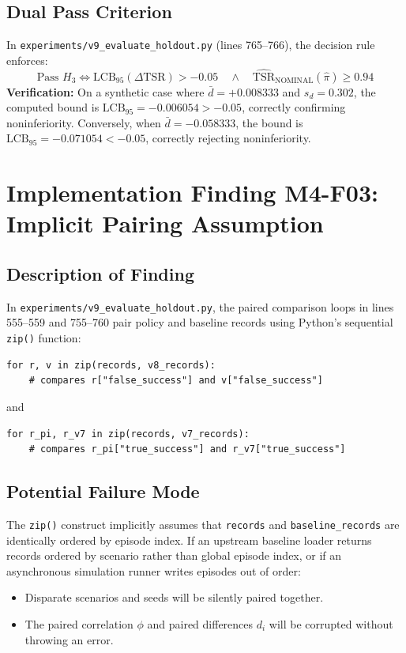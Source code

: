 \documentclass[10pt,a4paper]{article}
\begin{document}
\subsection{Dual Pass Criterion}
In \texttt{experiments/v9\_evaluate\_holdout.py} (lines 765--766), the decision rule enforces:
\begin{equation}
\text{Pass } H_3 \iff \mathrm{LCB}_{95}(\Delta\mathrm{TSR}) > -0.05 \quad\land\quad \widehat{\mathrm{TSR}}_{\mathrm{NOMINAL}}(\hat{\pi}) \ge 0.94
\end{equation}
\noindent \textbf{Verification:} On a synthetic case where $\bar{d} = +0.008333$ and $s_d = 0.302$, the computed bound is $\mathrm{LCB}_{95} = -0.006054 > -0.05$, correctly confirming noninferiority. Conversely, when $\bar{d} = -0.058333$, the bound is $\mathrm{LCB}_{95} = -0.071054 < -0.05$, correctly rejecting noninferiority.

\section{Implementation Finding M4-F03: Implicit Pairing Assumption}

\subsection{Description of Finding}
In \texttt{experiments/v9\_evaluate\_holdout.py}, the paired comparison loops in lines 555--559 and 755--760 pair policy and baseline records using Python's sequential \texttt{zip()} function:
\begin{verbatim}
for r, v in zip(records, v8_records):
    # compares r["false_success"] and v["false_success"]
\end{verbatim}
and
\begin{verbatim}
for r_pi, r_v7 in zip(records, v7_records):
    # compares r_pi["true_success"] and r_v7["true_success"]
\end{verbatim}

\subsection{Potential Failure Mode}
The \texttt{zip()} construct implicitly assumes that \texttt{records} and \texttt{baseline\_records} are identically ordered by episode index. If an upstream baseline loader returns records ordered by scenario rather than global episode index, or if an asynchronous simulation runner writes episodes out of order:
\begin{itemize}
    \item Disparate scenarios and seeds will be silently paired together.
    \item The paired correlation $\phi$ and paired differences $d_i$ will be corrupted without throwing an error.
\end{itemize}
\end{document}
